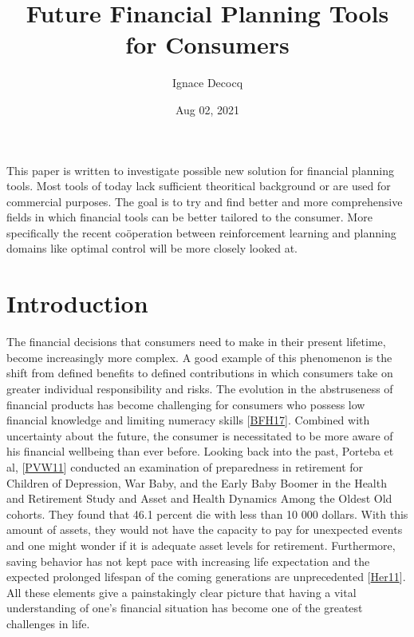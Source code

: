 \documentclass[letterpaper,10pt,english]{jupyterBook}
\title{Future Financial Planning Tools for Consumers}
\date{Aug 02, 2021}
\author{Ignace Decocq}
\begin{document}
\pagestyle{empty}
\sphinxmaketitle
\pagestyle{plain}
\sphinxtableofcontents
\pagestyle{normal}
\label{\detokenize{abstract::doc}}


\sphinxAtStartPar
This paper is  written to investigate possible new solution for financial planning tools. Most tools of today lack sufficient theoritical background or are used for commercial purposes. The goal is to try and find better and more comprehensive fields in which financial tools can be better tailored to the consumer. More specifically the recent coöperation between reinforcement learning and planning domains like optimal control will be more closely looked at.


\section{Introduction}
\label{\detokenize{Introduction:introduction}}\label{\detokenize{Introduction::doc}}
\sphinxAtStartPar
The financial decisions that consumers need to make in their present lifetime, become increasingly more complex. A good example of this phenomenon is the shift from defined benefits to defined contributions in which consumers take on greater individual responsibility and risks. The evolution in the abstruseness of financial products has become challenging for consumers who possess low financial knowledge and limiting numeracy skills {[}\hyperlink{cite.Financial_application:id31}{BFH17}{]}. Combined with uncertainty about the future, the consumer is necessitated to be more aware of his financial well\sphinxhyphen{}being than ever before. Looking back into the past, Porteba et al, {[}\hyperlink{cite.Financial_application:id33}{PVW11}{]} conducted an examination of preparedness in retirement for Children of Depression, War Baby, and the Early Baby Boomer in the Health and Retirement Study and Asset and Health Dynamics Among the Oldest Old cohorts. They found that 46.1 percent die with less than 10 000 dollars. With this amount of assets, they would not have the capacity to pay for unexpected events and one might wonder if it is adequate asset levels for retirement. Furthermore, saving behavior has not kept pace with increasing life expectation and the expected prolonged lifespan of the coming generations are unprecedented {[}\hyperlink{cite.Financial_application:id34}{Her11}{]}. All these elements give a painstakingly clear picture that having a vital understanding of one’s financial situation has become one of the greatest challenges in life.
\end{document}
